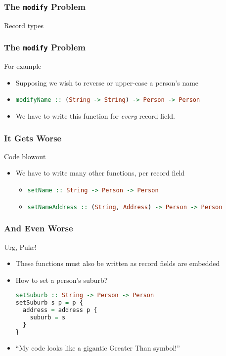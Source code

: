 \begin{frame}
\frametitle{The \lstinline$modify$ Problem}

\begin{block}{Record types}

\end{block}

\end{frame}

\begin{frame}
\frametitle{The \lstinline$modify$ Problem}

\begin{block}{For example}
\begin{itemize}
\item Supposing we wish to reverse or upper-case a person's name
\item \lstinline[language=haskell]$modifyName :: (String -> String) -> Person -> Person$
\item We have to write this function for \emph{every} record field.
\end{itemize}
\end{block}

\end{frame}

\begin{frame}
\frametitle{It Gets Worse}

\begin{block}{Code blowout}
\begin{itemize}
\item We have to write many other functions, per record field
  \begin{itemize}
  \item \lstinline[language=haskell]$setName :: String -> Person -> Person$
  \item \lstinline[language=haskell]$setNameAddress :: (String, Address) -> Person -> Person$
  \end{itemize}
\end{itemize}
\end{block}

\end{frame}

\begin{frame}[fragile]
\frametitle{And Even Worse}

\begin{block}{Urg, Puke!}
\begin{itemize}
\item These functions must also be written as record fields are embedded
\item How to set a person's suburb?
\begin{lstlisting}[language=haskell]
setSuburb :: String -> Person -> Person
setSuburb s p = p {
  address = address p {
    suburb = s
  }
}
\end{lstlisting}
\item ``My code looks like a gigantic Greater Than symbol!''

\end{itemize}
\end{block}

\end{frame}

